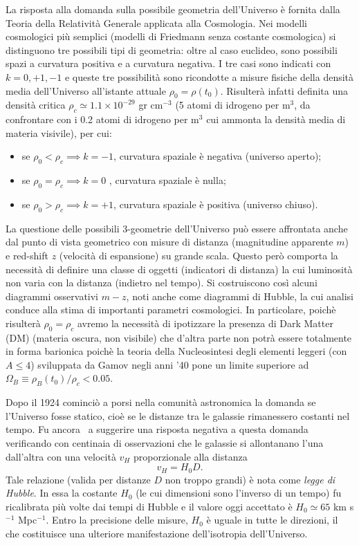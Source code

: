 La risposta alla domanda sulla possibile geometria dell'Universo è fornita dalla
Teoria della Relatività Generale applicata alla Cosmologia.  Nei modelli
cosmologici più semplici (modelli di Friedmann senza costante cosmologica) si
distinguono tre possibili tipi di geometria: oltre al caso euclideo, sono
possibili spazi a curvatura positiva e a curvatura negativa.  I tre casi sono
indicati con $k=0,+1,-1$ e queste tre possibilità sono ricondotte a misure
fisiche della densità media dell'Universo all'istante attuale
$\rho_0=\rho(t_0)$.  Risulterà infatti definita una densità critica $\rho_c
\simeq 1.1 \times 10^{-29}$ gr cm$^{-3}$ (5 atomi di idrogeno per m$^3$, da
confrontare con i 0.2 atomi di idrogeno per m$^3$ cui ammonta la densità media
di materia visivile), per cui:
\begin{itemize}
\item se $\rho_0 < \rho_c \implies k=-1$, curvatura spaziale è negativa
  (universo aperto);
\item se $\rho_0 = \rho_c \implies k=0$ , curvatura spaziale è nulla;
\item se $\rho_0 > \rho_c \implies k=+1$, curvatura spaziale è positiva
  (universo chiuso).
\end{itemize}
La questione delle possibili 3-geometrie dell'Universo può essere affrontata
anche dal punto di vista geometrico con misure di distanza (magnitudine
apparente $m$) e red-shift $z$ (velocità di espansione) su grande scala.  Questo
però comporta la necessità di definire una classe di oggetti (indicatori di
distanza) la cui luminosità non varia con la distanza (indietro nel tempo).  Si
costruiscono così alcuni diagrammi osservativi $m-z$, noti anche come diagrammi
di Hubble, la cui analisi conduce alla stima di importanti parametri
cosmologici.  In particolare, poichè risulterà $\rho_0 = \rho_c$ avremo la
necessità di ipotizzare la presenza di Dark Matter (DM) (materia oscura, non
visibile) che d'altra parte non potrà essere totalmente in forma barionica
poichè la teoria della Nucleosintesi degli elementi leggeri (con $A \le 4$)
sviluppata da Gamov negli anni '40 pone un limite superiore ad $\Omega_B \equiv
\rho_{B}(t_0) / \rho_c < 0.05$.

Dopo il 1924 cominciò a porsi nella comunità astronomica la domanda se
l'Universo fosse statico, cioè se le distanze tra le galassie rimanessero
costanti nel tempo.  Fu ancora~\textcite{1929PNAS...15..168H} a suggerire una
risposta negativa a questa domanda verificando con centinaia di osservazioni che
le galassie si allontanano l'una dall'altra con una velocità $v_H$ proporzionale
alla distanza
\begin{equation}
  v_H  = H_0 D.
\end{equation}
Tale relazione (valida per distanze $D$ non troppo grandi) è nota come
\emph{legge di Hubble}.  In essa la costante $H_0$ (le cui dimensioni sono
l'inverso di un tempo) fu ricalibrata più volte dai tempi di Hubble e il valore
oggi accettato è $H_0 \simeq 65$ km s$^{-1}$ Mpc$^{-1}$. {Entro la precisione
  delle misure, $H_0$ è uguale in tutte le direzioni, il che costituisce una
  ulteriore manifestazione dell'isotropia dell'Universo}.

